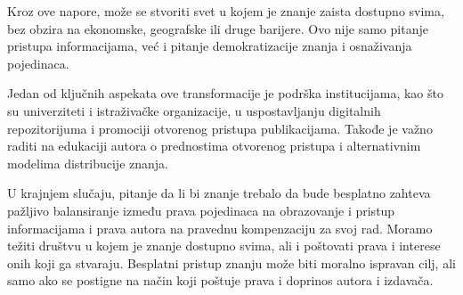 \documentclass{article}
\begin{document}
Kroz ove napore, može se stvoriti svet u kojem je znanje zaista dostupno svima, bez obzira na ekonomske, geografske ili druge barijere. Ovo nije samo pitanje pristupa informacijama, već i pitanje demokratizacije znanja i osnaživanja pojedinaca. 

Jedan od ključnih aspekata ove transformacije je podrška institucijama, kao što su univerziteti i istraživačke organizacije, u uspostavljanju digitalnih repozitorijuma i promociji otvorenog pristupa publikacijama. Takođe je važno raditi na edukaciji autora o prednostima otvorenog pristupa i alternativnim modelima distribucije znanja. 

U krajnjem slučaju, pitanje da li bi znanje trebalo da bude besplatno zahteva pažljivo balansiranje između prava pojedinaca na obrazovanje i pristup informacijama i prava autora na pravednu kompenzaciju za svoj rad. Moramo težiti društvu u kojem je znanje dostupno svima, ali i poštovati prava i interese onih koji ga stvaraju. Besplatni pristup znanju može biti moralno ispravan cilj, ali samo ako se postigne na način koji poštuje prava i doprinos autora i izdavača.

















\newpage





\end{document}
